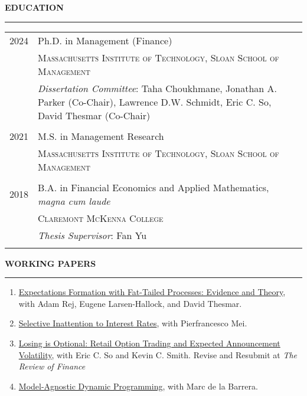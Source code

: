 \documentclass[a4paper, 10pt]{article}
\newcounter{mycounter}
\newcommand{\cvsec}[1]
{
	\needspace{2\baselineskip}
	\noindent \textbf{#1}
	
	\vspace{2pt}
	
	\hrule
	
	\bigskip
}
\newcommand{\cvitem}[2]{#1 & #2 \\ & \\}
\newenvironment{cvchrono}[1]
{
	\cvsec{#1}
	\begin{tabu} to \linewidth {X[1,l]X[6,l]} 
}
{
	\end{tabu}
}
\newenvironment{cvcontinue}[1]
{
	\cvsec{#1}
	\begin{enumerate}
		\setcounter{enumi}{\themycounter}
	}
	{
	\setcounter{mycounter}{\theenumi}
	\end{enumerate}
}
\begin{document}
\begin{cvchrono}{EDUCATION}
	\cvitem{2024}{Ph.D. in Management (Finance) \\
		& \textsc{Massachusetts Institute of Technology, Sloan School of Management} \\
		& \emph{Dissertation Committee}: Taha Choukhmane, Jonathan A. Parker (Co-Chair), Lawrence D.W. Schmidt, Eric C. So, David Thesmar (Co-Chair)
		} 
	\cvitem{2021}{M.S. in Management Research \\
		& \textsc{Massachusetts Institute of Technology, Sloan School of Management}
		} 
	\cvitem{2018}{B.A. in Financial Economics and Applied Mathematics, \emph{magna cum laude} \\
		& \textsc{Claremont McKenna College} \\
		& \emph{Thesis Supervisor}: Fan Yu
		}
\end{cvchrono}

\begin{cvcontinue}{WORKING PAPERS}
	\item \href{https://www.timdesilva.me/files/papers/fat_tails.pdf}{Expectations Formation with Fat-Tailed Processes: Evidence and Theory}, with Adam Rej, Eugene Larsen-Hallock, and David Thesmar.
	\item \href{https://www.timdesilva.me/files/papers/si.pdf}{Selective Inattention to Interest Rates}, with Pierfrancesco Mei.
	\item \href{https://www.timdesilva.me/files/papers/losing_optional.pdf}{Losing is Optional: Retail Option Trading and Expected Announcement Volatility}, with Eric C. So and Kevin C. Smith.  \newline Revise and Resubmit at \emph{The Review of Finance}
	\item \href{https://www.timdesilva.me/files/papers/agnostic_dp.pdf}{Model-Agnostic Dynamic Programming}, with Marc de la Barrera.
\end{cvcontinue}
\end{document}
